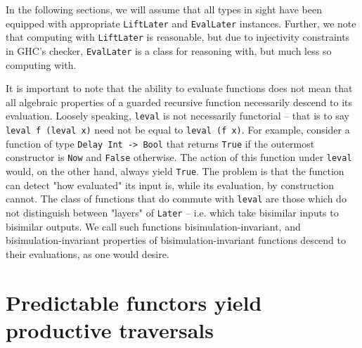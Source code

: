 \documentclass[sigplan,screen]{acmart}
\newcommand{\hs}{\texttt}
\newcommand{\hsn}{\texttt}
\begin{document}
In the following sections, we will assume that all types in sight have been equipped with appropriate \hs{LiftLater} and \hs{EvalLater} instances. Further, we note that computing with \hs{LiftLater} is reasonable, but due to injectivity constraints in GHC's checker, \hs{EvalLater} is a class for reasoning with, but much less so computing with.

It is important to note that the ability to evaluate functions does not mean that all algebraic properties of a guarded recursive function necessarily descend to its evaluation. Loosely speaking, \hs{leval} is not necessarily functorial -- that is to say \hsn{leval f (leval x)} need not be equal to \hsn{leval (f x)}. For example, consider a function of type \hs{Delay Int -> Bool} that returns \hs{True} if the outermost constructor is \hs{Now} and \hs{False} otherwise. The action of this function under \hs{leval} would, on the other hand, always yield \hs{True}. The problem is that the function can detect "how evaluated" its input is, while its evaluation, by construction cannot. The class of functions that do commute with \hs{leval} are those which do not distinguish between "layers" of \hs{Later} -- i.e. which take bisimilar inputs to bisimilar outputs. We call such functions bisimulation-invariant, and  bisimulation-invariant properties of bisimulation-invariant functions descend to their evaluations, as one would desire.


\section{Predictable functors yield productive traversals}




\end{document}
